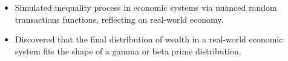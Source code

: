 

\begin{itemize}[nosep]
  \item Simulated inequality process in economic systems via nuanced random transactions functions, reflecting on real-world economy.
  \item Discovered that the final distribution of wealth in a real-world economic system fits the shape of a gamma or beta prime distribution.
\end{itemize}